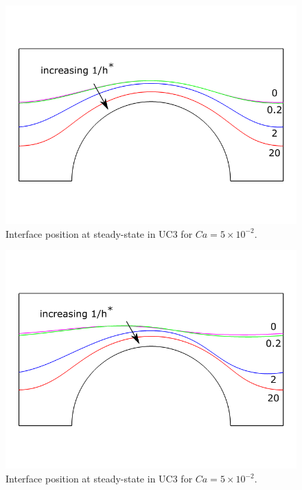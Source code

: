 \documentclass[]{article}
\begin{document}
\begin{figure}
\hypertarget{fig:interfaceCa1}{%
\centering
\includegraphics{figures/pdf/interfaceCa1.pdf}
\caption{Interface position at steady-state in UC3 for
\(Ca=5\times10^{-2}\).}\label{fig:interfaceCa1}
}
\end{figure}

\begin{figure}
\hypertarget{fig:interfaceCa005}{%
\centering
\includegraphics{figures/pdf/interfaceCa005.pdf}
\caption{Interface position at steady-state in UC3 for
\(Ca=5\times10^{-2}\).}\label{fig:interfaceCa005}
}
\end{figure}
\end{document}
